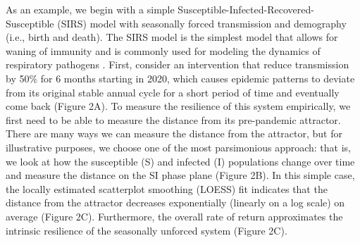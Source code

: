 \documentclass[12pt]{article}
\begin{document}
As an example, we begin with a simple Susceptible-Infected-Recovered-Susceptible (SIRS) model with seasonally forced transmission and demography (i.e., birth and death).
The SIRS model is the simplest model that allows for waning of immunity and is commonly used for modeling the dynamics of respiratory pathogens \citep{dushoff2004dynamical}.
First, consider an intervention that reduce transmission by 50\% for 6 months starting in 2020, which causes epidemic patterns to deviate from its original stable annual cycle for a short period of time and eventually come back (Figure 2A).
To measure the resilience of this system empirically, we first need to be able to measure the distance from its pre-pandemic attractor.
There are many ways we can measure the distance from the attractor, but for illustrative purposes, we choose one of the most parsimonious approach: that is, we look at how the susceptible (S) and infected (I) populations change over time and measure the distance on the SI phase plane (Figure 2B).
In this simple case, the locally estimated scatterplot smoothing (LOESS) fit indicates that the distance from the attractor decreases exponentially (linearly on a log scale) on average (Figure 2C).
Furthermore, the overall rate of return approximates the intrinsic resilience of the seasonally unforced system (Figure 2C).
\end{document}
